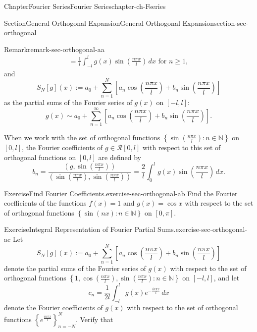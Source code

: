 \documentclass[oneside,10pt,]{book}
\numberwithin{equation}{section}
\newcommand{\cR}{\mathcal{R}}
\begin{document}
\begin{chapterptx}{Chapter}{Fourier Series}{}{Fourier Series}{}{}{chapter-ch-Fseries}
\begin{sectionptx}{Section}{General Orthogonal Expansion}{}{General Orthogonal Expansion}{}{}{section-sec-orthogonal}
\begin{remark}{Remark}{}{remark-sec-orthogonal-aa}
\begin{align*}
= \frac{1}{l} \int_{-l}^{l} g(x) \sin \left(\frac{n \pi x}{l}\right) \, dx \text{ for } n\ge 1,
\end{align*}
and%
\begin{equation*}
S_{N}[g](x):=a_0 +\sum_{n=1}^{N}\left[ a_n \cos \left(\frac{n \pi x}{l}\right) + b_n \sin \left(\frac{n \pi x}{l}\right) \right]
\end{equation*}
as the partial sums of the Fourier series of \(g(x)\) on  \([-l, l]\):%
\begin{equation*}
g(x)\sim a_0 +\sum_{n=1}^{\infty}\left[ a_n \cos \left(\frac{n \pi x}{l}\right) + b_n \sin \left(\frac{n \pi x}{l}\right) \right].
\end{equation*}
%
\par
When we work with the set of orthogonal functions \(\left\{\sin \left(\frac{n \pi x}{l}\right): n\in\mathbb N\right\}\) on \([0, l]\), the Fourier coefficients of \(g\in \cR[0,l]\) with respect to this set of orthogonal functions on \([0, l]\) are defined by%
\begin{equation*}
b_{n}=\frac{(g, \sin \left(\frac{n \pi x}{l}\right))}{(\sin \left(\frac{n \pi x}{l}\right),\sin \left(\frac{n \pi x}{l}\right))}
=\frac 2l \int_{0}^{l} g(x) \sin \left(\frac{n \pi x}{l}\right)\, dx.
\end{equation*}
%
\end{remark}
\begin{inlineexercise}{Exercise}{Find Fourier Coefficients.}{exercise-sec-orthogonal-ab}%
Find the Fourier coefficients of the functions \(f(x)=1\) and \(g(x)=\cos x\)  with respect to the set of orthogonal functions \(\left\{ \sin (nx): n\in\mathbb N\right\}\) on \([0, \pi]\).\end{inlineexercise}%
\begin{inlineexercise}{Exercise}{Integral Representation of Fourier Partial Sums.}{exercise-sec-orthogonal-ac}%
Let%
\begin{equation*}
S_{N}[g](x):=a_0 +\sum_{n=1}^{N}\left[ a_n \cos \left(\frac{n \pi x}{l}\right) + b_n \sin \left(\frac{n \pi x}{l}\right) \right]
\end{equation*}
denote the partial sums of the Fourier series of \(g(x)\) with respect to the  set of orthogonal functions \(\left\{ 1,  \cos \left(\frac{n \pi x}{l}\right), \sin \left(\frac{n \pi x}{l}\right) : n\in\mathbb N\right\}\) on \([-l, l]\), and let%
\begin{equation*}
c_{n}=\frac{1}{2l} \int_{-l}^{l} g(x) e^{-\frac{i n\pi x}{l}}\, dx
\end{equation*}
denote the Fourier coefficients of \(g(x)\) with respect to the set of orthogonal functions \(\left\{ e^{\frac{i n\pi x}{l}}\right\}_{n=-N}^{N}\). Verify that%

\end{inlineexercise}
\end{sectionptx}
\end{chapterptx}
\end{document}
